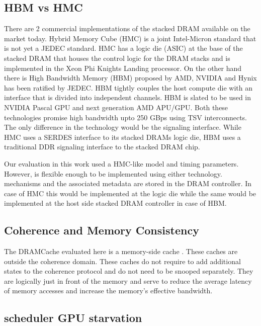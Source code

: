\subsection{HBM vs HMC}
There are 2 commercial implementations of the stacked DRAM available on the market today. 
Hybrid Memory Cube (HMC) is a joint Intel-Micron standard that is not yet a JEDEC standard. 
HMC has a logic die (ASIC) at the base of the stacked DRAM that houses the control logic for the DRAM stacks and is implemented in the Xeon Phi Knights Landing processor. 
On the other hand there is High Bandwidth Memory (HBM) proposed by AMD, NVIDIA and Hynix has been ratified by JEDEC. 
HBM tightly couples the host compute die with an interface that is divided into independent channels.
HBM is slated to be used in NVIDIA Pascal GPU and next generation AMD APU/GPU.
Both these technologies promise high bandwidth upto 250 GBps using TSV interconnects. The only difference in the technology would be the signaling interface. While HMC uses a SERDES interface to its stacked DRAMs logic die, HBM uses a traditional DDR signaling interface to the stacked DRAM chip.
\par Our evaluation in this work used a HMC-like model and timing parameters. However, \cachename is flexible enough to be implemented using either technology. \cachename mechanisms and the associated metadata are stored in the DRAM controller. In case of HMC this would be implemented at the logic die while the same would be implemented at the host side stacked DRAM controller in case of HBM.

\subsection{Coherence and Memory Consistency} \label{discussion:coherence}
The DRAMCache evaluated here is a memory-side cache \cite{primer-coherence-consistency, mainak-hpca, skylake}.  These caches are outside the coherence domain. These caches do not require to add additional states to the coherence protocol and do not need to be snooped separately. They are logically just in front of the memory and serve to reduce the average latency of memory accesses and increase the memory's effective bandwidth. 
\par 

\subsection{\prioname scheduler GPU starvation}

